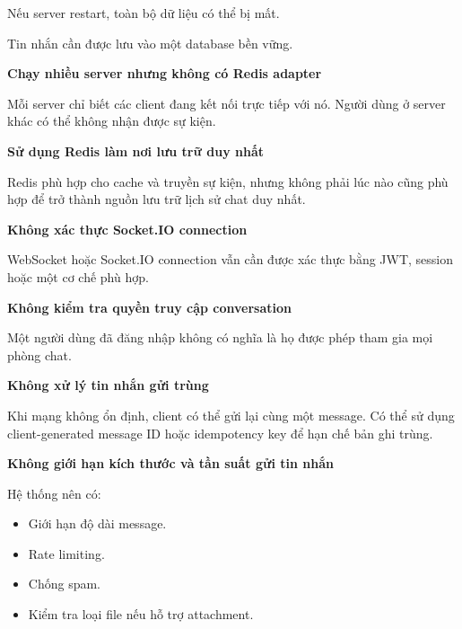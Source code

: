 Nếu server restart, toàn bộ dữ liệu có thể bị mất.

\begin{Shaded}
\begin{Highlighting}[]
\end{Highlighting}
\end{Shaded}

Tin nhắn cần được lưu vào một database bền vững.

\vspace{0.5em}\noindent\textbf{Chạy nhiều server nhưng không có Redis
adapter}\par

Mỗi server chỉ biết các client đang kết nối trực tiếp với nó. Người dùng
ở server khác có thể không nhận được sự kiện.

\vspace{0.5em}\noindent\textbf{Sử dụng Redis làm nơi lưu trữ duy
nhất}\par

Redis phù hợp cho cache và truyền sự kiện, nhưng không phải lúc nào cũng
phù hợp để trở thành nguồn lưu trữ lịch sử chat duy nhất.

\vspace{0.5em}\noindent\textbf{Không xác thực Socket.IO
connection}\par

WebSocket hoặc Socket.IO connection vẫn cần được xác thực bằng JWT,
session hoặc một cơ chế phù hợp.

\vspace{0.5em}\noindent\textbf{Không kiểm tra quyền truy cập
conversation}\par

Một người dùng đã đăng nhập không có nghĩa là họ được phép tham gia mọi
phòng chat.

\vspace{0.5em}\noindent\textbf{Không xử lý tin nhắn gửi
trùng}\par

Khi mạng không ổn định, client có thể gửi lại cùng một message. Có thể
sử dụng client-generated message ID hoặc idempotency key để hạn chế bản
ghi trùng.

\vspace{0.5em}\noindent\textbf{Không giới hạn kích thước và tần suất gửi tin
nhắn}\par

Hệ thống nên có:

\begin{itemize}
\tightlist
\item
  Giới hạn độ dài message.
\item
  Rate limiting.
\item
  Chống spam.
\item
  Kiểm tra loại file nếu hỗ trợ attachment.
\end{itemize}

